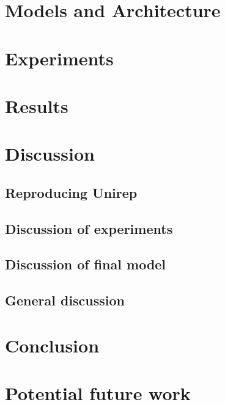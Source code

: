 \documentclass[a4paper]{article}
\begin{document}
\section{Models and Architecture}

\section{Experiments}


\section{Results}


\section{Discussion}
\subsection{Reproducing Unirep}
\subsection{Discussion of experiments}
\subsection{Discussion of final model}
\subsection{General discussion}

\section{Conclusion}

\section{Potential future work}



{}

\end{document}
